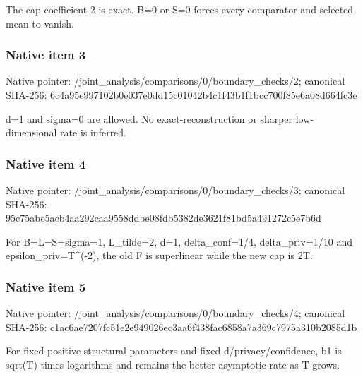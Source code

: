 \documentclass[10pt,a4paper]{article}
\begin{document}
\begingroup\raggedright\sloppy The cap coefficient 2 is exact. B=\allowbreak{}0 or S=\allowbreak{}0 forces every comparator and selected mean to vanish.\par\endgroup

\subsubsection{Native item 3}
Native pointer: /joint\_\allowbreak{}analysis/comparisons/0/boundary\_\allowbreak{}checks/2; canonical SHA-256: 6c4a95e997102b0e037e0dd15c01042b4c1f43b1f1bcc700f85e6a08d664fc3e

\begingroup\raggedright\sloppy d=\allowbreak{}1 and sigma=\allowbreak{}0 are allowed. No exact-reconstruction or sharper low-dimensional rate is inferred.\par\endgroup

\subsubsection{Native item 4}
Native pointer: /joint\_\allowbreak{}analysis/comparisons/0/boundary\_\allowbreak{}checks/3; canonical SHA-256: 95c75abe5acb4aa292caa9558ddbe08fdb5382de3621f81bd5a491272c5e7b6d

\begingroup\raggedright\sloppy For B=\allowbreak{}L=\allowbreak{}S=\allowbreak{}sigma=\allowbreak{}1,\allowbreak{} L\_\allowbreak{}tilde=\allowbreak{}2,\allowbreak{} d=\allowbreak{}1,\allowbreak{} delta\_\allowbreak{}conf=\allowbreak{}1/\allowbreak{}4,\allowbreak{} delta\_\allowbreak{}priv=\allowbreak{}1/\allowbreak{}10 and epsilon\_\allowbreak{}priv=\allowbreak{}T\textasciicircum{}(-2),\allowbreak{} the old F is superlinear while the new cap is 2T.\par\endgroup

\subsubsection{Native item 5}
Native pointer: /joint\_\allowbreak{}analysis/comparisons/0/boundary\_\allowbreak{}checks/4; canonical SHA-256: c1ac6ae7207fc51e2e949026ec3aa6f438fac6858a7a369c7975a310b2085d1b

\begingroup\raggedright\sloppy For fixed positive structural parameters and fixed d/\allowbreak{}privacy/\allowbreak{}confidence,\allowbreak{} b1 is sqrt(T) times logarithms and remains the better asymptotic rate as T grows.\par\endgroup
\end{document}
